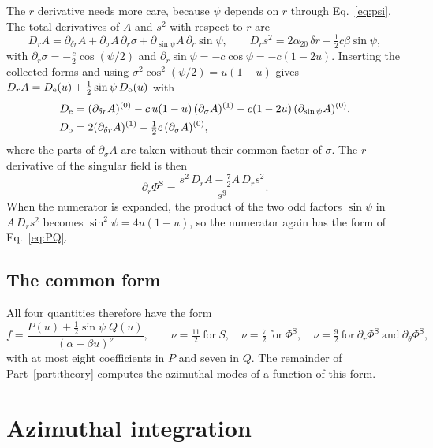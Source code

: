 \documentclass[11pt]{article}
\newcommand{\PhiS}{\Phi^{\mathrm{S}}}
\begin{document}
The $r$ derivative needs more care, because $\psi$ depends on $r$ through
Eq.~\eqref{eq:psi}. The total derivatives of $A$ and $s^2$ with respect to
$r$ are
\begin{equation}
  \label{eq:total_r}
  D_rA = \partial_{\delta r}A + \partial_\sigma A\,\partial_r\sigma + \partial_{\sin\psi}A\,\partial_r\sin\psi,
  \qquad
  D_r s^2 = 2\alpha_{20}\,\delta r - \tfrac12 c\beta\sin\psi,
\end{equation}
with $\partial_r\sigma=-\tfrac{c}{2}\cos(\psi/2)$ and
$\partial_r\sin\psi=-c\cos\psi=-c(1-2u)$. Inserting the collected forms and
using $\sigma^2\cos^2(\psi/2)=u(1-u)$ gives
$D_rA = D_{\rm e}(u) + \tfrac12\sin\psi\,D_{\rm o}(u)$ with
\begin{align}
  D_{\rm e} &= (\partial_{\delta r}A)^{(0)} - c\,u(1-u)\,(\partial_\sigma A)^{(1)} - c(1-2u)\,(\partial_{\sin\psi}A)^{(0)}, \label{eq:De}\\
  D_{\rm o} &= 2(\partial_{\delta r}A)^{(1)} - \tfrac12 c\,(\partial_\sigma A)^{(0)}, \label{eq:Do}
\end{align}
where the parts of $\partial_\sigma A$ are taken without their common factor of
$\sigma$. The $r$ derivative of the singular field is then
\begin{equation}
  \label{eq:dr_numerator}
  \partial_r\PhiS = \frac{s^2\,D_rA - \tfrac72 A\,D_r s^2}{s^9}.
\end{equation}
When the numerator is expanded, the product of the two odd factors
$\sin\psi$ in $A\,D_rs^2$ becomes $\sin^2\psi=4u(1-u)$, so the numerator again
has the form of Eq.~\eqref{eq:PQ}.

\subsection{The common form}

All four quantities therefore have the form
\begin{equation}
  \label{eq:general}
  f = \frac{P(u) + \tfrac12\sin\psi\;Q(u)}{(\alpha+\beta u)^{\nu}}, \qquad
  \nu=\tfrac{11}{2}\ \text{for}\ S,\quad \nu=\tfrac72\ \text{for}\ \PhiS,\quad
  \nu=\tfrac92\ \text{for}\ \partial_r\PhiS\ \text{and}\ \partial_\theta\PhiS,
\end{equation}
with at most eight coefficients in $P$ and seven in $Q$. The remainder of
Part~\ref{part:theory} computes the azimuthal modes of a function of this
form.

\section{Azimuthal integration}
\label{sec:integration}
\end{document}
